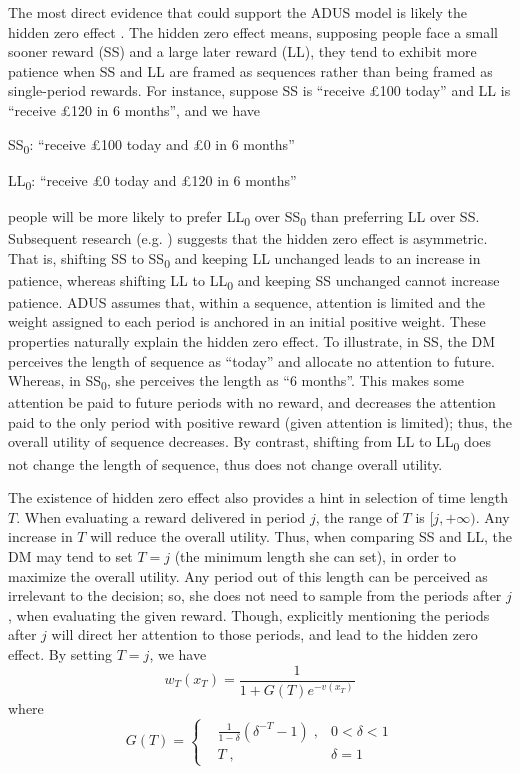 \documentclass[
  12pt,
]{article}
\begin{document}
The most direct evidence that could support the ADUS model is likely the
hidden zero effect \citep{magen_hidden-zero_2008}. The hidden zero
effect means, supposing people face a small sooner reward (SS) and a
large later reward (LL), they tend to exhibit more patience when SS and
LL are framed as sequences rather than being framed as single-period
rewards. For instance, suppose SS is ``receive £100 today'' and LL is
``receive £120 in 6 months'', and we have

SS\textsubscript{0}: ``receive £100 today and £0 in 6 months''

LL\textsubscript{0}: ``receive £0 today and £120 in 6 months''

people will be more likely to prefer LL\textsubscript{0} over
SS\textsubscript{0} than preferring LL over SS. Subsequent research
(e.g. \citet{read_value_2017}) suggests that the hidden zero effect is
asymmetric. That is, shifting SS to SS\textsubscript{0} and keeping LL
unchanged leads to an increase in patience, whereas shifting LL to
LL\textsubscript{0} and keeping SS unchanged cannot increase patience.
ADUS assumes that, within a sequence, attention is limited and the
weight assigned to each period is anchored in an initial positive
weight. These properties naturally explain the hidden zero effect. To
illustrate, in SS, the DM perceives the length of sequence as ``today''
and allocate no attention to future. Whereas, in SS\textsubscript{0},
she perceives the length as ``6 months''. This makes some attention be
paid to future periods with no reward, and decreases the attention paid
to the only period with positive reward (given attention is limited);
thus, the overall utility of sequence decreases. By contrast, shifting
from LL to LL\textsubscript{0} does not change the length of sequence,
thus does not change overall utility.

The existence of hidden zero effect also provides a hint in selection of
time length \(T\). When evaluating a reward delivered in period \(j\),
the range of \(T\) is \([j,+\infty)\). Any increase in \(T\) will reduce
the overall utility. Thus, when comparing SS and LL, the DM may tend to
set \(T=j\) (the minimum length she can set), in order to maximize the
overall utility. Any period out of this length can be perceived as
irrelevant to the decision; so, she does not need to sample from the
periods after \(j\), when evaluating the given reward. Though,
explicitly mentioning the periods after \(j\) will direct her attention
to those periods, and lead to the hidden zero effect. By setting
\(T=j\), we
have\[ w_T(x_T) = \frac{1}{1+G(T)e^{-v(x_T)}} \]where\[ G(T) = \left\{ \begin{aligned} & \frac{1}{1-\delta}(\delta^{-T}-1) \; ,& 0<\delta<1\\ & T\; ,& \delta=1\ \end{aligned} \right. \]
\end{document}
